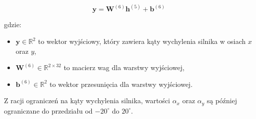 \begin{equation}
\mathbf{y} = \mathbf{W}^{(6)} \mathbf{h}^{(5)} + \mathbf{b}^{(6)}
\end{equation}

gdzie:
\begin{itemize}
  \item \( \mathbf{y} \in \mathbb{R}^2 \) to wektor wyjściowy, który zawiera kąty wychylenia silnika w osiach \( x \) oraz \( y \),
  \item \( \mathbf{W}^{(6)} \in \mathbb{R}^{2 \times 32} \) to macierz wag dla warstwy wyjściowej,
  \item \( \mathbf{b}^{(6)} \in \mathbb{R}^2 \) to wektor przesunięcia dla warstwy wyjściowej.
\end{itemize}

Z racji ograniczeń na kąty wychylenia silnika, wartości \( \alpha_x \) oraz \( \alpha_y \) są później ograniczane do przedziału od \(-20^\circ\) do \(20^\circ\).






